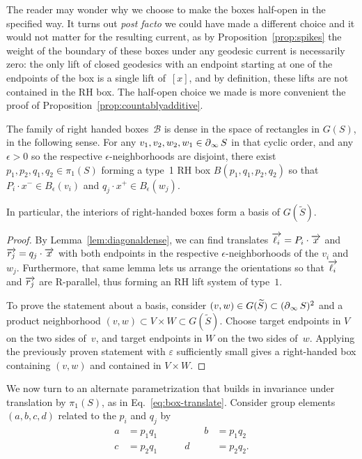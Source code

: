 \begin{remark}
  The reader may wonder why we choose to make the boxes half-open in the specified way. It turns out \textit{post facto} we could have made a different choice and it would not matter for the resulting current, as by Proposition~\ref{prop:spikes} the weight of the boundary of these boxes under any geodesic current is necessarily zero: the only lift of closed geodesics with an endpoint starting at one of the endpoints of the box is a single lift of~$[x]$, and by definition, these lifts are not contained in the RH box. The half-open choice we made is more convenient the proof of Proposition~\ref{prop:countablyadditive}.
  \label{rmk:no_atom_boundary_box}
\end{remark}

\begin{proposition}
The family of right handed boxes~$\mathcal{B}$ is dense in the space
of rectangles in $G(S)$, in the following sense. For any
$v_1,v_2,w_2,w_1\in \operatorname{\partial}_\infty S$ in that cyclic order,
and any $\epsilon>0$ so the respective $\epsilon$-neighborhoods are
disjoint, there exist $p_1,p_2,q_1,q_2 \in \pi_1(S)$ forming a
type~1 RH box $B(p_1,q_1,p_2,q_2)$ so that $P_i\cdot x^- \in B_\epsilon(v_i)$
and $q_j\cdot x^+ \in B_\epsilon(w_j)$.

In particular, the interiors of right-handed boxes
form a basis of $G(\widetilde S)$.  
\label{prop:density}
\end{proposition}
\begin{proof}
  By Lemma~\ref{lem:diagonaldense}, we can find translates $\overrightarrow{\ell_i} = P_i\cdot \overrightarrow{x}$ and $\overrightarrow{r_j} = q_j \cdot \overrightarrow{x}$ with both endpoints in the respective $\epsilon$-neighborhoods of the $v_i$ and $w_j$. Furthermore, that same lemma lets us arrange the orientations so that $\overrightarrow{\ell_i}$ and $\overrightarrow{r_j}$ are R-parallel, thus forming an RH lift system of type~$1$.


  To prove the statement about a basis, consider $(v,w) \in G(\widetilde S) \subset (\operatorname{\partial}_\infty S)^2$ and a product neighborhood $(v,w) \subset V \times W \subset G(\widetilde S)$. Choose target endpoints in $V$ on the two sides of~$v$, and target endpoints in $W$ on the two sides of~$w$. Applying the previously proven statement with $\varepsilon$ sufficiently small gives a right-handed box containing $(v,w)$ and contained in $V\times W$.
\end{proof}

We now turn to an alternate parametrization that builds in invariance
under translation by $\pi_1(S)$, as in
Eq.~\eqref{eq:box-translate}. Consider group elements $(a,b,c,d)$ related to the $p_i$ and $q_j$ by
\begin{equation}
\begin{aligned}
  a &= p_1 q_1\qquad&\qquad b &= p_1 q_2\\[2pt]
  c &= p_2 q_1 & d &= p_2 q_2.
\end{aligned}
  \label{eq:relationdatum}
\end{equation}

